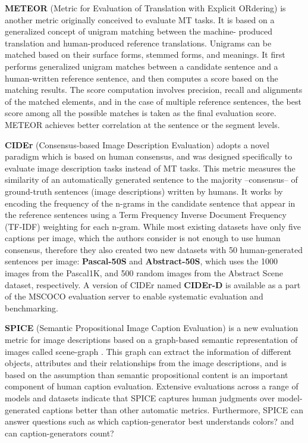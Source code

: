 \textbf{METEOR} (Metric for Evaluation of Translation with Explicit ORdering) \citep{Banerjee2005} is another metric originally conceived to evaluate MT tasks. It is based on a generalized concept of unigram matching between the machine- produced translation and human-produced reference translations. Unigrams can be matched based on their surface forms, stemmed forms, and meanings. It first performs generalized unigram matches between a candidate sentence and a human-written reference sentence, and then computes a score based on the matching results. The score computation involves precision, recall and alignments of the matched elements, and in the case of multiple reference sentences, the best score among all the possible matches is taken as the final evaluation score. METEOR achieves better correlation at the sentence or the segment levels.

\textbf{CIDEr} (Consensus-based Image Description Evaluation) \citep{Vedantam2015} adopts a novel paradigm which is based on human consensus, and was designed specifically to evaluate image description tasks instead of MT tasks. This metric measures the similarity of an automatically generated sentence to the majority --consensus-- of ground-truth sentences (image descriptions) written by humans. It works by encoding the frequency of the n-grams in the candidate sentence that appear in the reference sentences using a Term Frequency Inverse Document Frequency (TF-IDF) weighting for each n-gram. While most existing datasets have only five captions per image, which the authors consider is not enough to use human consensus, therefore they also created two new datasets with 50 human-generated sentences per image: \textbf{Pascal-50S} and \textbf{Abstract-50S}, which uses the 1000 images from the Pascal1K, and 500 random images from the Abstract Scene dataset, respectively. A version of CIDEr named \textbf{CIDEr-D} is available as a part of the MSCOCO evaluation server to enable systematic evaluation and benchmarking.

\textbf{SPICE} (Semantic Propositional Image Caption Evaluation) \citep{Anderson2016} is a new evaluation metric for image descriptions based on a graph-based semantic representation of images called scene-graph \citep{Johnson2015, Schuster2015}. This graph can extract the information of different objects, attributes and their relationships from the image descriptions, and is based on the assumption than semantic propositional content is an important component of human caption evaluation. Extensive evaluations across a range of models and datasets indicate that SPICE captures human judgments over model-generated captions better than other automatic metrics. Furthermore, SPICE can answer questions such as which caption-generator best understands colors? and can caption-generators count?

